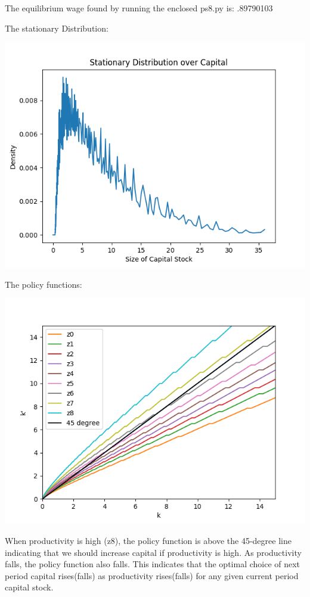 \documentclass{article}
\begin{document}
The equilibrium wage found by running the enclosed ps8.py is: .89790103

The stationary Distribution:
\begin{center}
\includegraphics[scale = .65]{dist}
\end{center}

The policy functions:
\begin{center}
\includegraphics[scale = .65]{policy}
\end{center}
\newpage

When productivity is high (z8), the policy function is above the 45-degree line indicating that we should increase capital if productivity is high.
As productivity falls, the policy function also falls. This indicates that the optimal choice  of next period capital rises(falls) as productivity rises(falls) for any given current period capital stock.
\end{document}
